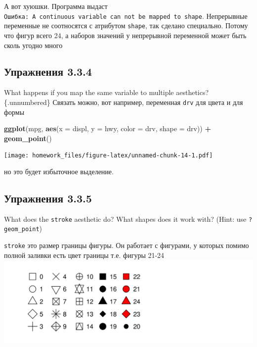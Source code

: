 \documentclass[]{book}
\newenvironment{Shaded}{\begin{snugshade}}{\end{snugshade}}
\newcommand{\KeywordTok}[1]{\textcolor[rgb]{0.13,0.29,0.53}{\textbf{#1}}}
\newcommand{\DataTypeTok}[1]{\textcolor[rgb]{0.13,0.29,0.53}{#1}}
\newcommand{\StringTok}[1]{\textcolor[rgb]{0.31,0.60,0.02}{#1}}
\newcommand{\OperatorTok}[1]{\textcolor[rgb]{0.81,0.36,0.00}{\textbf{#1}}}
\newcommand{\NormalTok}[1]{#1}
\begin{document}
А вот хуюшки. Программа выдаст
\texttt{Ошибка:\ A\ continuous\ variable\ can\ not\ be\ mapped\ to\ shape}.
Непрерывные переменные не соотносятся с атрибутом \texttt{shape}, так
сделано специально. Потому что фигур всего 24, а наборов значений у
непрерывной переменной может быть сколь угодно много

\subsection*{Упражнения 3.3.4}\label{-3.3.4}

What happens if you map the same variable to multiple aesthetics?
\{.unnumbered\} Связать можно, вот например, переменная \texttt{drv} для
цвета и для формы

\begin{Shaded}
\begin{Highlighting}[]
\KeywordTok{ggplot}\NormalTok{(mpg, }\KeywordTok{aes}\NormalTok{(}\DataTypeTok{x =}\NormalTok{ displ, }\DataTypeTok{y =}\NormalTok{ hwy, }\DataTypeTok{color =}\NormalTok{ drv, }\DataTypeTok{shape =}\NormalTok{ drv)) }\OperatorTok{+}\StringTok{ }\KeywordTok{geom_point}\NormalTok{()}
\end{Highlighting}
\end{Shaded}

\texttt{[image: homework\_files/figure-latex/unnamed-chunk-14-1.pdf]}

но это будет избыточное выделение.

\subsection*{Упражнения 3.3.5}\label{-3.3.5}

What does the \texttt{stroke} aesthetic do? What shapes does it work
with? (Hint: use \texttt{?geom\_point})

\texttt{stroke} это размер границы фигуры. Он работает с фигурами, у
которых помимо полной заливки есть цвет границы т.е. фигуры 21-24
\includegraphics{img/shapes.png}
\end{document}
